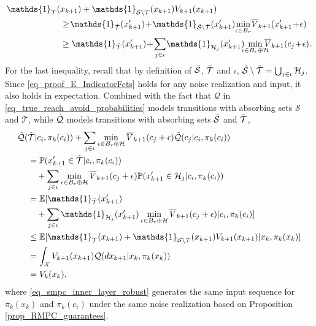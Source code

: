 \documentclass{IEEEtran}
\begin{document}
\begin{appendices}
\begin{subequations}
    \begin{align}
    \mathds{1}_{\mathcal{T}}(&x_{k+1}) + \mathds{1}_{\mathcal{S}\setminus\mathcal{T}}(x_{k+1})V_{k+1}(x_{k+1})
    \\
    &\geq\!\mathds{1}_{\tilde{\mathcal{T}}}(x'_{k+1})\!+\!\mathds{1}_{\tilde{\mathcal{S}}\setminus\tilde{\mathcal{T}}}(x'_{k+1})\!\min_{\epsilon\in B_r}\!\overline{V}_{k+1}(x'_{k+1}\!+\!\epsilon) 
    \\
    &\geq
    \mathds{1}_{\tilde{\mathcal{T}}}(x'_{k+1})\!+\!\sum_{j\in\iota}\!\mathds{1}_{\mathcal{H}_j}(x'_{k+1})\hspace{-.5em}\min_{\epsilon\in B_r\oplus\mathcal{H}}\hspace{-.7em}\overline{V}_{k+1}(c_j\!+\!\epsilon). 
\end{align}
\label{eq_proof_E_IndicatorFcts}%
\end{subequations}%
For the last inequality, recall that by definition of $\Tilde{\mathcal{S}}$, $\Tilde{\mathcal{T}}$ and $\iota$, $\Tilde{\mathcal{S}}\setminus\Tilde{\mathcal{T}}=\bigcup_{j\in\iota}\mathcal{H}_j$. Since \eqref{eq_proof_E_IndicatorFcts} holds for any noise realization and input, it also holds in expectation. Combined with the fact that $\mathcal{Q}$ in \eqref{eq_true_reach_avoid_probabilities} models transitions with absorbing sets $\mathcal{S}$ and $\mathcal{T}$, while $\Tilde{\mathcal{Q}}$ models transitions with absorbing sets $\Tilde{\mathcal{S}}$ and $\Tilde{\mathcal{T}}$,
\begin{align*}
    \Tilde{\mathcal{Q}}(&\Tilde{\mathcal{T}}| c_i,\pi_k(c_i)) +\sum_{j\in\iota}\min_{\epsilon\in B_r\oplus\mathcal{H}}\overline{V}_{k+1}(c_j+\epsilon)\Tilde{\mathcal{Q}}(c_j| c_i,\pi_k(c_i)) 
    \\
    &=\mathbb{P}({x}'_{k+1}\in\tilde{\mathcal{T}}| c_i,\pi_k(c_i)) \\&\quad +\sum_{j\in\iota}\min_{\epsilon\in B_r\oplus\mathcal{H}}\overline{V}_{k+1}(c_j+\epsilon)\mathbb{P}({x}'_{k+1}\in\mathcal{H}_j| c_i,\pi_k(c_i)) 
    \\
    &=\mathbb{E}[\mathds{1}_{\tilde{\mathcal{T}}}(x'_{k+1}) \\&\quad + \sum_{j\in\iota}\mathds{1}_{\mathcal{H}_j}(x'_{k+1})\min_{\epsilon\in B_r\oplus\mathcal{H}}\overline{V}_{k+1}(c_j+\epsilon) | c_i,\pi_k(c_i)]
    \\
    &\leq\mathbb{E}[\mathds{1}_{\mathcal{T}}(x_{k+1})+ \mathds{1}_{\mathcal{S}\setminus\mathcal{T}}(x_{k+1})V_{k+1}(x_{k+1}) | x_k,\pi_k(x_k)]
    \\
    &= \int_{\mathcal{X}}{V}_{k+1}(x_{k+1})\mathcal{Q}(dx_{k+1}| {x}_k,\pi_k({x}_k))
    \\
    &= V_k({x}_k),
\end{align*}
where \eqref{eq_smpc_inner_layer_robust} generates the same input sequence for $\pi_k(x_k)$ and $\pi_k(c_i)$ under the same noise realization based on Proposition \eqref{prop_RMPC_guarantees}.



\end{appendices}
\end{document}

